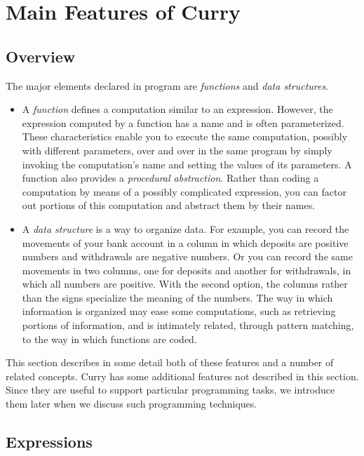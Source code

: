 \chapter{Main Features of Curry}

\section{Overview}

The major elements declared in program are
\emph{functions} and \emph{data structures}.

\begin{itemize}
\item{} 
A \emph{function} defines
a computation similar to an expression.
However, the expression computed by a function
has a name and is often parameterized.
These characteristics enable you to execute the same computation, possibly
with different parameters, over and over in the same program
by simply invoking the computation's name
and setting the values of its parameters.
A function also provides a \emph{procedural abstraction}.
Rather than coding a computation by means of a possibly
complicated expression, you can factor out portions of this computation
and abstract them by their names.
\item{} 
A \emph{data structure} is a way to organize data.
For example, you can record the movements of your bank account
in a column in which deposits are positive numbers and withdrawals
are negative numbers.  Or you can record the same movements in
two columns, one for deposits and another for withdrawals,
in which all numbers are positive.
With the second option,
the columns rather than the signs specialize the meaning of the numbers.
The way in which information is organized may ease some computations,
such as retrieving portions of information, and
is intimately related, through pattern matching,
to the way in which functions are coded.
\end{itemize}
%
This section describes in some detail both of these features and
a number of related concepts.
Curry has some additional features not described in this section.
Since they are useful to support particular programming tasks,
we introduce them later when we discuss such programming techniques.


\section{Expressions}

